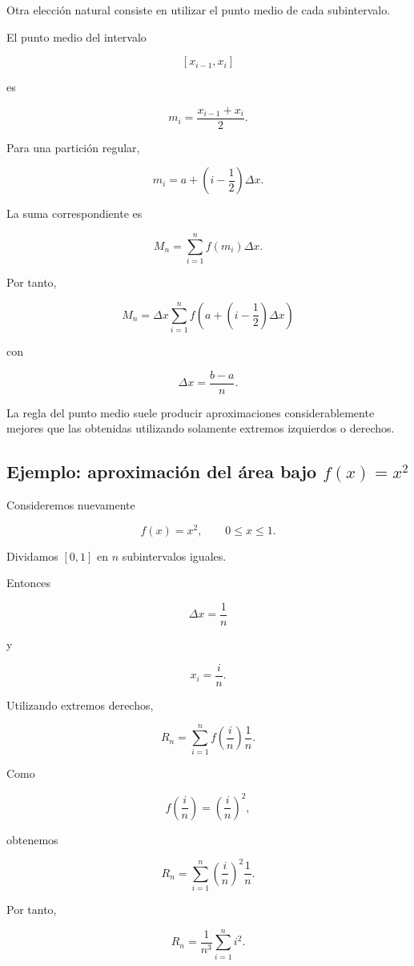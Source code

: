 \documentclass[12pt]{article}
\begin{document}
Otra elección natural consiste en utilizar el punto medio de cada
subintervalo.

El punto medio del intervalo

\[
[x_{i-1},x_i]
\]

es

\[
m_i
=
\frac{x_{i-1}+x_i}{2}.
\]

Para una partición regular,

\[
m_i
=
a+\left(i-\frac{1}{2}\right)\Delta x.
\]

La suma correspondiente es

\[
M_n
=
\sum_{i=1}^{n}
f(m_i)\Delta x.
\]

Por tanto,

\[
\boxed{
M_n
=
\Delta x
\sum_{i=1}^{n}
f\left(
a+\left(i-\frac{1}{2}\right)\Delta x
\right)
}
\]

con

\[
\Delta x=\frac{b-a}{n}.
\]

La regla del punto medio suele producir aproximaciones considerablemente
mejores que las obtenidas utilizando solamente extremos izquierdos o
derechos.

\subsection{Ejemplo: aproximación del área bajo $f(x)=x^2$}

Consideremos nuevamente

\[
f(x)=x^2,
\qquad
0\leq x\leq1.
\]

Dividamos $[0,1]$ en $n$ subintervalos iguales.

Entonces

\[
\Delta x=\frac{1}{n}
\]

y

\[
x_i=\frac{i}{n}.
\]

Utilizando extremos derechos,

\[
R_n
=
\sum_{i=1}^{n}
f\left(\frac{i}{n}\right)\frac{1}{n}.
\]

Como

\[
f\left(\frac{i}{n}\right)
=
\left(\frac{i}{n}\right)^2,
\]

obtenemos

\[
R_n
=
\sum_{i=1}^{n}
\left(\frac{i}{n}\right)^2
\frac{1}{n}.
\]

Por tanto,

\[
R_n
=
\frac{1}{n^3}
\sum_{i=1}^{n}i^2.
\]
\end{document}
